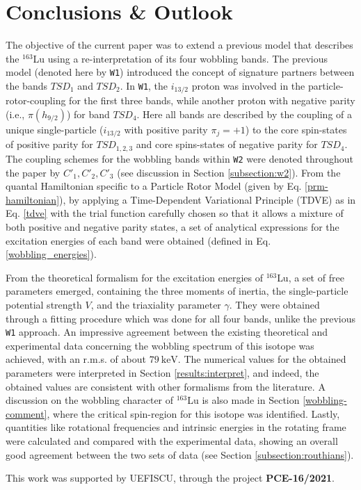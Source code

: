 \documentclass[myclassdoc,debug]{rjparticle}
\begin{document}
\section{Conclusions \& Outlook}
\label{section-gata}
The objective of the current paper was to extend a previous model that describes the $^{163}$Lu using a re-interpretation of its four wobbling bands. The previous model (denoted here by \texttt{W1}) introduced the concept of signature partners between the bands $TSD_1$ and $TSD_2$. In \texttt{W1}, the $i_{13/2}$ proton was involved in the particle-rotor-coupling for the first three bands, while another proton with negative parity (i.e., $\pi(h_{9/2})$) for band $TSD_4$. Here all bands are described by the coupling of a unique single-particle ($i_{13/2}$ with positive parity $\pi_{j}=+1$) to the core spin-states of positive parity for $TSD_{1,2,3}$ and core spins-states of negative parity for $TSD_4$. The coupling schemes for the wobbling bands within \texttt{W2} were denoted throughout the paper by $C'_1, C'_2, C'_3$ (see discussion in Section \ref{subsection:w2}). From the quantal Hamiltonian specific to a Particle Rotor Model (given by Eq. \ref{prm-hamiltonian}), by applying a Time-Dependent Variational Principle (TDVE) as in Eq. \ref{tdve} with the trial function carefully chosen so that it allows a mixture of both positive and negative parity states, a set of analytical expressions for the excitation energies of each band were obtained (defined in Eq. \ref{wobbling_energies}).

From the theoretical formalism for the excitation energies of $^{163}$Lu, a set of free parameters emerged, containing the three moments of inertia, the single-particle potential strength $V$, and the triaxiality parameter $\gamma$. They were obtained through a fitting procedure which was done for all four bands, unlike the previous \texttt{W1} approach. An impressive agreement between the existing theoretical and experimental data concerning the wobbling spectrum of this isotope was achieved, with an r.m.s. of about $79\ \text{keV}$. The numerical values for the obtained parameters were interpreted in Section \ref{results:interpret}, and indeed, the obtained values are consistent with other formalisms from the literature. A discussion on the wobbling character of $^{163}$Lu is also made in Section \ref{wobbling-comment}, where the critical spin-region for this isotope was identified. Lastly, quantities like rotational frequencies and intrinsic energies in the rotating frame were calculated and compared with the experimental data, showing an overall good agreement between the two sets of data (see Section \ref{subsection:routhians}).
\begin{acknowledgement}
This work was supported by UEFISCU, through the project \textbf{PCE-16/2021}.
\end{acknowledgement}
\end{document}
